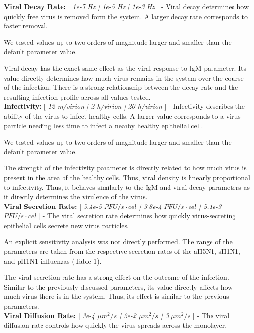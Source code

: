 \documentclass[10pt]{article}
\begin{document}
\textbf{Viral Decay Rate:} [ \textit{1e-7 Hz | 1e-5 Hz | 1e-3 Hz} ] - Viral decay determines how quickly free virus is removed form the system.  A larger decay rate corresponds to faster removal.

We tested values up to two orders of magnitude larger and smaller than the default parameter value.

Viral decay has the exact same effect as the viral response to IgM parameter.  Its value directly determines how much virus remains in the system over the course of the infection.  There is a strong relationship between the decay rate and the resulting infection profile across all values tested. \\


\textbf{Infectivity:} [ \textit{12 m/virion | 2 h/virion | 20 h/virion} ] - Infectivity describes the ability of the virus to infect healthy cells.  A larger value corresponds to a virus particle needing less time to infect a nearby healthy epithelial cell.

We tested values up to two orders of magnitude larger and smaller than the default parameter value.

The strength of the infectivity parameter is directly related to how much virus is present in the area of the healthy cells.  Thus, viral density is linearly proportional to infectivity.  Thus, it behaves similarly to the IgM and viral decay parameters as it directly determines the virulence of the virus. \\


\textbf{Viral Secretion Rate:} [ \textit{5.4e-5 $PFU/s\cdot cel$ | 3.8e-4 $PFU/s\cdot cel$ | 5.1e-3 $PFU/s\cdot cel$} ] - The viral secretion rate determines how quickly virus-secreting epithelial cells secrete new virus particles.

An explicit sensitivity analysis was not directly performed.  The range of the parameters are taken from the respective secretion rates of the aH5N1, sH1N1, and pH1N1 influenzas (Table 1).

The viral secretion rate has a strong effect on the outcome of the infection.  Similar to the previously discussed parameters, its value directly affects how much virus there is in the system.  Thus, its effect is similar to the previous parameters. \\


\textbf{Viral Diffusion Rate:} [ \textit{3e-4 $\mu m^2/s$ | 3e-2 $\mu m^2/s$ | 3 $\mu m^2/s$} ] - The viral diffusion rate controls how quickly the virus spreads across the monolayer.
\end{document}
